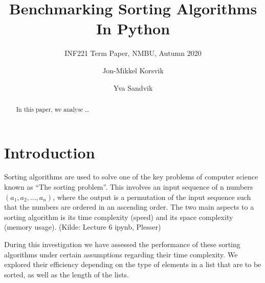 \documentclass[sigconf, nonacm, natbib, screen, balance=False]{acmart}
\begin{document}
\title{Benchmarking Sorting Algorithms In Python}
\subtitle{INF221 Term Paper, NMBU, Autumn 2020}

\author{Jon-Mikkel Korsvik}
\affiliation{}  %

\author{Yva Sandvik}

\begin{abstract}
  In this paper, we analyse \dots 
\end{abstract}


\maketitle

\section{Introduction}\label{sec:intro}

Sorting algorithms are used to solve one of the key problems of computer science known as “The sorting problem”. This involves an input sequence of n numbers $(a_1, a_2, … , a_n)$, where the output is a permutation of the input sequence such that the numbers are ordered in an ascending order. The two main aspects to a sorting algorithm is its time complexity (speed) and its space complexity (memory usage). (Kilde: Lecture 6 ipynb, Plesser)

During this investigation we have assessed the performance of these sorting algorithms under certain assumptions regarding their time complexity. We explored their efficiency depending on the type of elements in a list that are to be sorted, as well as the length of the lists. 
\end{document}
